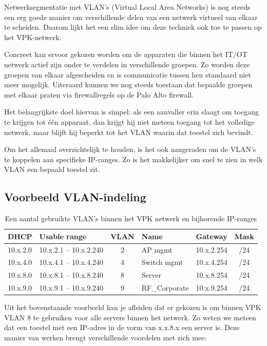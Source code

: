 Netwerksegmentatie met VLAN’s (Virtual Local Area Networks) is nog steeds een erg goede manier om verschillende delen van een netwerk virtueel van elkaar te scheiden. Daarom lijkt het een slim idee om deze techniek ook toe te passen op het VPK-netwerk.

Concreet kan ervoor gekozen worden om de apparaten die binnen het IT/OT netwerk actief zijn onder te verdelen in verschillende groepen. Zo worden deze groepen van elkaar afgescheiden en is communicatie tussen hen standaard niet meer mogelijk. Uiteraard kunnen we nog steeds toestaan dat bepaalde groepen met elkaar praten via firewallregels op de Palo Alto firewall.

Het belangrijkste doel hiervan is simpel: als een aanvaller erin slaagt om toegang te krijgen tot één apparaat, dan krijgt hij niet meteen toegang tot het volledige netwerk, maar blijft hij beperkt tot het VLAN waarin dat toestel zich bevindt.

Om het allemaal overzichtelijk te houden, is het ook aangeraden om de VLAN’s te koppelen aan specifieke IP-ranges. Zo is het makkelijker om snel te zien in welk VLAN een bepaald toestel zit.

\subsection*{Voorbeeld VLAN-indeling}

\begin{table}[h!]
    \centering
    \begin{tabular}{|l|l|c|l|l|c|}
        \hline
        \textbf{DHCP} & \textbf{Usable range} & \textbf{VLAN} & \textbf{Name} & \textbf{Gateway} & \textbf{Mask} \\
        \hline
        10.x.2.0 & 10.x.2.1 -- 10.x.2.240 & 2 & AP mgmt & 10.x.2.254 & /24 \\
        10.x.4.0 & 10.x.4.1 -- 10.x.4.240 & 4 & Switch mgmt & 10.x.4.254 & /24 \\
        10.x.8.0 & 10.x.8.1 -- 10.x.8.240 & 8 & Server & 10.x.8.254 & /24 \\
        10.x.9.0 & 10.x.9.1 -- 10.x.9.240 & 9 & RF\_Corporate & 10.x.9.254 & /24 \\
        \hline
    \end{tabular}
    \caption{Een aantal gebruikte VLAN's binnen het VPK netwerk en bijhorende IP-ranges}
\end{table}

Uit het bovenstaande voorbeeld kan je afleiden dat er gekozen is om binnen VPK VLAN 8 te gebruiken voor alle servers binnen het netwerk. Zo weten we meteen dat een toestel met een IP-adres in de vorm van x.x.8.x een server is. Deze manier van werken brengt verschillende voordelen met zich mee:

